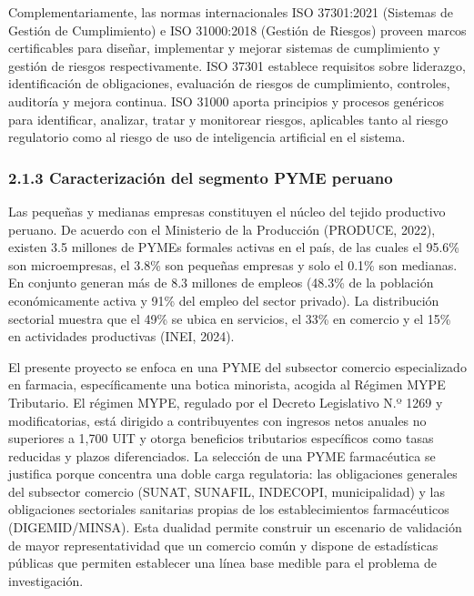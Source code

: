 \documentclass[12pt,a4paper,oneside]{report}
\begin{document}
Complementariamente, las normas internacionales ISO 37301:2021 (Sistemas
de Gestión de Cumplimiento) e ISO 31000:2018 (Gestión de Riesgos)
proveen marcos certificables para diseñar, implementar y mejorar
sistemas de cumplimiento y gestión de riesgos respectivamente. ISO 37301
establece requisitos sobre liderazgo, identificación de obligaciones,
evaluación de riesgos de cumplimiento, controles, auditoría y mejora
continua. ISO 31000 aporta principios y procesos genéricos para
identificar, analizar, tratar y monitorear riesgos, aplicables tanto al
riesgo regulatorio como al riesgo de uso de inteligencia artificial en
el sistema.

\subsubsection{2.1.3 Caracterización del segmento PYME
peruano}\label{caracterizaciuxf3n-del-segmento-pyme-peruano}

Las pequeñas y medianas empresas constituyen el núcleo del tejido
productivo peruano. De acuerdo con el Ministerio de la Producción
(PRODUCE, 2022), existen 3.5 millones de PYMEs formales activas en el
país, de las cuales el 95.6\% son microempresas, el 3.8\% son pequeñas
empresas y solo el 0.1\% son medianas. En conjunto generan más de 8.3
millones de empleos (48.3\% de la población económicamente activa y 91\%
del empleo del sector privado). La distribución sectorial muestra que el
49\% se ubica en servicios, el 33\% en comercio y el 15\% en actividades
productivas (INEI, 2024).

El presente proyecto se enfoca en una PYME del subsector comercio
especializado en farmacia, específicamente una botica minorista, acogida
al Régimen MYPE Tributario. El régimen MYPE, regulado por el Decreto
Legislativo N.º 1269 y modificatorias, está dirigido a contribuyentes
con ingresos netos anuales no superiores a 1,700 UIT y otorga beneficios
tributarios específicos como tasas reducidas y plazos diferenciados. La
selección de una PYME farmacéutica se justifica porque concentra una
doble carga regulatoria: las obligaciones generales del subsector
comercio (SUNAT, SUNAFIL, INDECOPI, municipalidad) y las obligaciones
sectoriales sanitarias propias de los establecimientos farmacéuticos
(DIGEMID/MINSA). Esta dualidad permite construir un escenario de
validación de mayor representatividad que un comercio común y dispone de
estadísticas públicas que permiten establecer una línea base medible
para el problema de investigación.
\end{document}
